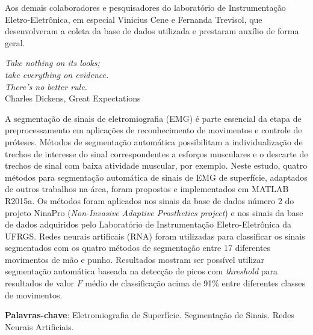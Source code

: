 
\begin{agradecimentos}
	Aos demais colaboradores e pesquisadores do laboratório de Instrumentação Eletro-Eletrônica, em especial Vinicius Cene e Fernanda Trevisol, que desenvolveram a coleta da base de dados utilizada e prestaram auxílio de forma geral.
\end{agradecimentos}


\begin{epigrafe}
    \vspace*{\fill}
	\begin{flushright}
		\textit{Take nothing on its looks;\\ take everything on evidence.\\ There's no better rule.}\\ \vspace{\onelineskip}
		Charles Dickens, Great Expectations
	\end{flushright}
\end{epigrafe}


\setlength{\absparsep}{18pt} %
\begin{resumo}

	A segmentação de sinais de eletromiografia (EMG) é parte essencial da etapa de preprocessamento em aplicações de reconhecimento de movimentos e controle de próteses. Métodos de segmentação automática possibilitam a individualização de trechos de interesse do sinal correspondentes a esforços musculares e o descarte de trechos de sinal com baixa atividade muscular, por exemplo. Neste estudo, quatro métodos para segmentação automática de sinais de EMG de superfície, adaptados de outros trabalhos na área, foram propostos e implementados em MATLAB R2015a. Os métodos foram aplicados nos sinais da base de dados número 2 do projeto NinaPro (\emph{Non-Invasive Adaptive Prosthetics project}) e nos sinais da base de dados adquiridos pelo Laboratório de Instrumentação Eletro-Eletrônica da UFRGS. Redes neurais artificais (RNA) foram utilizadas para classificar os sinais segmentados com os quatro métodos de segmentação entre 17 diferentes movimentos de mão e punho. Resultados mostram ser possível utilizar segmentação automática baseada na detecção de picos com \emph{threshold} para resultados de valor $F$ médio de classificação acima de 91\% entre diferentes classes de movimentos.
	

	\vspace{\onelineskip}
	\textbf{Palavras-chave}: Eletromiografia de Superfície. Segmentação de Sinais. Redes Neurais Artificiais.
\end{resumo}

